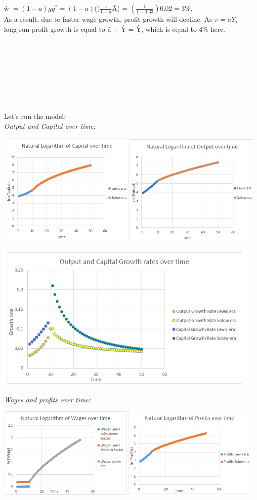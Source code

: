 \documentclass{article}
\begin{document}
{\^w} $= (1−a)gy^{\ast}= (1−a)((\frac{1}{1-a}${\^A}) = $(\frac{1}{1-0.33})0.02 = 3\%$. \\
As a result, due to faster wage growth, profit growth will decline. As $\pi=aY$, long-run profit growth is equal to {\^a} + {\^Y} = {\^Y},  which is equal to 4\% here. \\
\\
\\
\\
\\
\\
\\
\\
\\
Let’s run the model: \\
\textit {Output and Capital over time:} \\
\begin{center}
\includegraphics[scale=0.63]{graph1.png} \\
\end{center}
\begin{center}
\includegraphics[scale=0.75]{graph2.png} \\
\end{center}
\textit {Wages and profits over time:} \\
\begin{center}
\includegraphics[scale=0.63]{graph3.png} 
\end{center}
\end{document}
